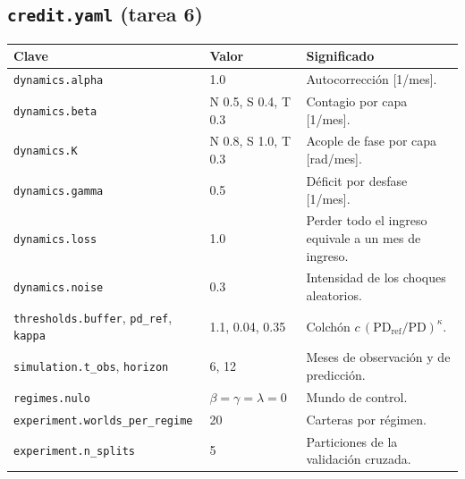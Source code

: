 \subsection*{\texttt{credit.yaml} (tarea 6)}
\begin{longtable}{L{0.36\textwidth}L{0.2\textwidth}L{0.36\textwidth}}
\toprule
\textbf{Clave} & \textbf{Valor} & \textbf{Significado} \\
\midrule
\endhead
\texttt{dynamics.alpha} & 1.0 & Autocorrección [1/mes]. \\
\texttt{dynamics.beta} & N 0.5, S 0.4, T 0.3 & Contagio por capa [1/mes]. \\
\texttt{dynamics.K} & N 0.8, S 1.0, T 0.3 & Acople de fase por capa [rad/mes]. \\
\texttt{dynamics.gamma} & 0.5 & Déficit por desfase [1/mes]. \\
\texttt{dynamics.loss} & 1.0 & Perder todo el ingreso equivale a un mes de ingreso. \\
\texttt{dynamics.noise} & 0.3 & Intensidad de los choques aleatorios. \\
\texttt{thresholds.buffer}, \texttt{pd\_ref}, \texttt{kappa} & 1.1, 0.04, 0.35 & Colchón
$c\,(\mathrm{PD}_\text{ref}/\mathrm{PD})^\kappa$. \\
\texttt{simulation.t\_obs}, \texttt{horizon} & 6, 12 & Meses de observación y de
predicción. \\
\texttt{regimes.nulo} & $\beta=\gamma=\lambda=0$ & Mundo de control. \\
\texttt{experiment.}\-\texttt{worlds\_per\_regime} & 20 & Carteras por régimen. \\
\texttt{experiment.n\_splits} & 5 & Particiones de la validación cruzada. \\
\bottomrule
\end{longtable}

